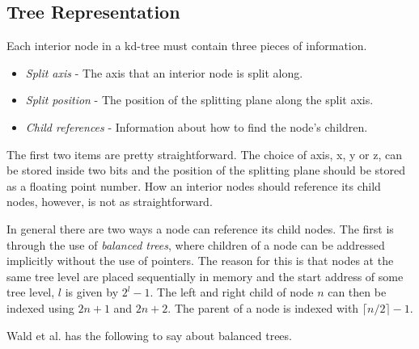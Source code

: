 \subsection{Tree Representation}\label{sec:treeRepresentan}

Each interior node in a kd-tree must contain three pieces of information.

\begin{itemize}
\item \textit{Split axis} - The axis that an interior node is split
  along.
\item \textit{Split position} - The position of the splitting plane
  along the split axis.
\item \textit{Child references} - Information about how to find the
  node's children.
\end{itemize}

The first two items are pretty straightforward. The choice of axis, x,
y or z, can be stored inside two bits and the position of the splitting
plane should be stored as a floating point number. How an interior
nodes should reference its child nodes, however, is not as
straightforward.


In general there are two ways a node can reference its child
nodes. The first is through the use of \textit{balanced trees}, where
children of a node can be addressed implicitly without the use of
pointers. The reason for this is that nodes at the same tree level are
placed sequentially in memory and the start address of some tree
level, $l$ is given by $2^l-1$. The left and right child of node $n$
can then be indexed using $2n+1$ and $2n+2$. The parent of a node is
indexed with $\lceil n/2 \rceil - 1$.


Wald et al. has the following to say about
balanced trees.



